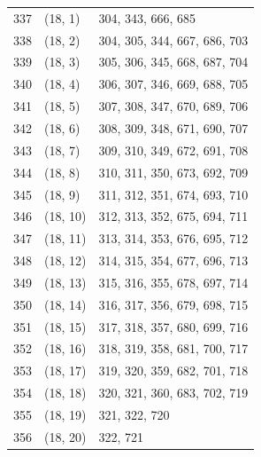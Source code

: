 \documentclass{article}
\begin{document}
\begin{longtable}{lll}
  337 & (18, 1) & 304, 343, 666, 685 \\
  338 & (18, 2) & 304, 305, 344, 667, 686, 703 \\
  339 & (18, 3) & 305, 306, 345, 668, 687, 704 \\
  340 & (18, 4) & 306, 307, 346, 669, 688, 705 \\
  341 & (18, 5) & 307, 308, 347, 670, 689, 706 \\
  342 & (18, 6) & 308, 309, 348, 671, 690, 707 \\
  343 & (18, 7) & 309, 310, 349, 672, 691, 708 \\
  344 & (18, 8) & 310, 311, 350, 673, 692, 709 \\
  345 & (18, 9) & 311, 312, 351, 674, 693, 710 \\
  346 & (18, 10) & 312, 313, 352, 675, 694, 711 \\
  347 & (18, 11) & 313, 314, 353, 676, 695, 712 \\
  348 & (18, 12) & 314, 315, 354, 677, 696, 713 \\
  349 & (18, 13) & 315, 316, 355, 678, 697, 714 \\
  350 & (18, 14) & 316, 317, 356, 679, 698, 715 \\
  351 & (18, 15) & 317, 318, 357, 680, 699, 716 \\
  352 & (18, 16) & 318, 319, 358, 681, 700, 717 \\
  353 & (18, 17) & 319, 320, 359, 682, 701, 718 \\
  354 & (18, 18) & 320, 321, 360, 683, 702, 719 \\
  355 & (18, 19) & 321, 322, 720 \\
  356 & (18, 20) & 322, 721 \\
\end{longtable}



\end{document}

